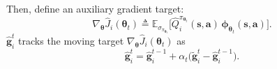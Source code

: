 \documentclass{IEEEtran}
\begin{document}
Then, define an auxiliary gradient target: 
\begin{equation}
\nabla_{\boldsymbol{\theta}}\hat{J}_i(\boldsymbol{\theta}_t)
\triangleq
\mathbb{E}_{\sigma_{\pi_{\boldsymbol{\theta}_t}}}\Big[\hat{Q}_i^{\pi_{\boldsymbol{\theta}_t}}(\boldsymbol{s},\boldsymbol{a})\,\boldsymbol{\phi}_{\boldsymbol{\theta}_t}(\boldsymbol{s},\boldsymbol{a})\Big]. 
\label{eq:appC_aux_grad_def}
\end{equation}
$\hat{\boldsymbol{g}}_i^t$ tracks the moving target $\nabla_{\boldsymbol{\theta}}\hat{J}_i(\boldsymbol{\theta}_t)$ as
\begin{equation}
\hat{\boldsymbol{g}}_i^{t}=\hat{\boldsymbol{g}}_i^{t-1}+\alpha_t\big(\tilde{\boldsymbol{g}}_i^{t}-\hat{\boldsymbol{g}}_i^{t-1}\big).
\label{eq:appC_g_recursion}
\end{equation}
\end{document}
